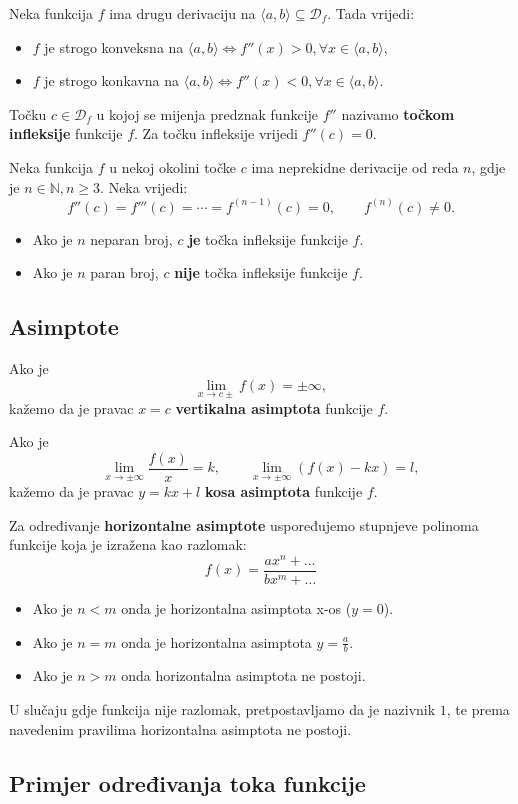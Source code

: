 \begin{theorem}
    Neka funkcija $f$ ima drugu derivaciju na $\langle a,b \rangle\subseteq\mathcal{D}_f$.
    Tada vrijedi:
    \begin{itemize}
        \item $f$ je strogo konveksna na $\langle a,b \rangle \Leftrightarrow f''(x)>0,\forall x \in \langle a,b \rangle$,
        \item $f$ je strogo konkavna na $\langle a,b \rangle \Leftrightarrow f''(x)<0,\forall x \in \langle a,b \rangle$.
    \end{itemize}
\end{theorem}

Točku $c\in\mathcal{D}_f$ u kojoj se mijenja predznak funkcije $f''$ nazivamo
\textbf{točkom infleksije} funkcije $f$. Za točku infleksije vrijedi $f''(c) = 0$.

\begin{theorem}
    Neka funkcija $f$ u nekoj okolini točke $c$ ima neprekidne derivacije od
    reda $n$, gdje je $n\in\mathbb{N}, n\geq 3$.
    Neka vrijedi:
    $$
    f''(c)=f'''(c)=\cdots=f^{(n-1)}(c)=0,\qquad f^{(n)}(c) \neq 0.
    $$

    \begin{itemize}
        \item Ako je $n$ neparan broj, $c$ \textbf{je} točka infleksije funkcije $f$.
        \item Ako je $n$ paran broj, $c$ \textbf{nije} točka infleksije funkcije $f$.
    \end{itemize}
\end{theorem}

\subsection{Asimptote}

Ako je
$$
\lim_{x\to c\pm}f(x)=\pm\infty,
$$
kažemo da je pravac $x=c$ \textbf{vertikalna asimptota} funkcije $f$.

Ako je
$$
\lim_{x\to\pm\infty}\frac{f(x)}{x}=k,\qquad \lim_{x\to\pm\infty}(f(x)-kx)=l,
$$
kažemo da je pravac $y=kx+l$ \textbf{kosa asimptota} funkcije $f$.

Za određivanje \textbf{horizontalne asimptote} uspoređujemo stupnjeve polinoma
funkcije koja je izražena kao razlomak:
$$
f(x)=\frac{ax^n+\dots}{bx^m+\dots}
$$
\begin{itemize}
    \item Ako je $n<m$ onda je horizontalna asimptota x-os ($y=0$).
    \item Ako je $n=m$ onda je horizontalna asimptota $\displaystyle y=\frac{a}{b}$.
    \item Ako je $n>m$ onda horizontalna asimptota ne postoji.
\end{itemize}

U slučaju gdje funkcija nije razlomak, pretpostavljamo da je nazivnik $1$, te
prema navedenim pravilima horizontalna asimptota ne postoji.

\subsection{Primjer određivanja toka funkcije}


